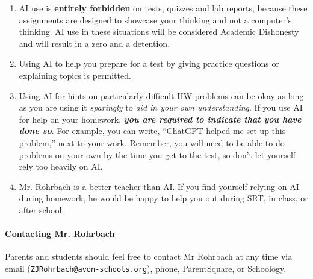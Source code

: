 \documentclass[10pt]{exam}
\begin{document}
	\begin{enumerate}
		\item AI use is \textbf{entirely forbidden} on tests, quizzes and lab reports, because these assignments are designed to showcase your thinking and not a computer's thinking.  AI use in these situations will be considered Academic Dishonesty and will result in a zero and a detention.
		\item Using AI to help you prepare for a test by giving practice questions or explaining topics is permitted.
		\item Using AI for hints on particularly difficult HW problems can be okay as long as you are using it \emph{sparingly} to \emph{aid in your own understanding}. If you use AI for help on your homework, \textbf{\emph{you are required to indicate that you have done so}}. For example, you can write, ``ChatGPT helped me set up this problem,'' next to your work.  Remember, you will need to be able to do problems on your own by the time you get to the test, so don't let yourself rely too heavily on AI.
		\item Mr. Rohrbach is a better teacher than AI.  If you find yourself relying on AI during homework, he would be happy to help you out during SRT, in class, or after school.  
	\end{enumerate}

\paragraph{Contacting Mr. Rohrbach}
	Parents and students should feel free to contact Mr Rohrbach at any time via email (\texttt{ZJRohrbach@avon-schools.org}), phone, ParentSquare, or Schoology.
\end{document}
